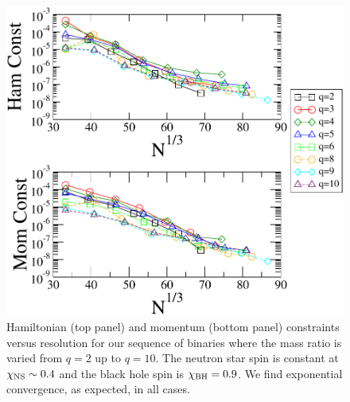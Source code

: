 \begin{figure}
\includegraphics[width=0.95\columnwidth]{chap4/qSeqHam}
\caption[Hamiltonian and momentum constraint for the $q$ sequence.]{\label{fig:qSeqHam}Hamiltonian (top panel) and momentum (bottom panel) constraints versus resolution for our sequence of binaries where the mass ratio is varied from $q=2$ up to $q=10$. The neutron star spin is constant at $\chi_{\rm NS}\sim 0.4$ and the black hole spin is $\chi_{\rm BH}=0.9$. We find exponential convergence, as expected, in all cases.}
\end{figure}

